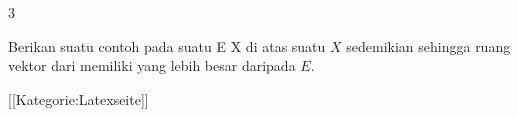 {3}
{

Berikan suatu contoh
pada suatu
 { E } { X
} {}
di atas suatu
$X$ sedemikian sehingga ruang vektor
 dari
memiliki
yang lebih besar daripada
$E$.

}
{} {}

 [[Kategorie:Latexseite]]
